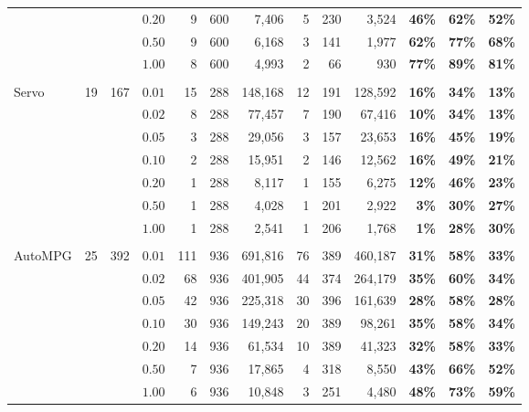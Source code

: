 \documentclass[mnsc,nonblindrev]{informs3} %
\begin{document}
\begin{center}
\begin{table}[h!]
\begin{tabular}{l r r r|r r r | r r r  | r r r }
		&&&$0.20$&9&600&7,406&5&230&3,524&\textbf{46\%}&\textbf{62\%}&\textbf{52\%}\\
		&&&$0.50$&9&600&6,168&3&141&1,977&\textbf{62\%}&\textbf{77\%}&\textbf{68\%}\\
		&&&$1.00$&8&600&4,993&2&66&930&\textbf{77\%}&\textbf{89\%}&\textbf{81\%}\\
		&&&&&&&&&&&&\\
		\multirow{7}{*}{Servo}&\multirow{7}{*}{19}&\multirow{7}{*}{167}&
		$0.01$&15&288&148,168&12&191&128,592&\textbf{16\%}&\textbf{34\%}&\textbf{13\%}\\
		&&&$0.02$&8&288&77,457&7&190&67,416&\textbf{10\%}&\textbf{34\%}&\textbf{13\%}\\
		&&&$0.05$&3&288&29,056&3&157&23,653&\textbf{16\%}&\textbf{45\%}&\textbf{19\%}\\
		&&&$0.10$&2&288&15,951&2&146&12,562&\textbf{16\%}&\textbf{49\%}&\textbf{21\%}\\
		&&&$0.20$&1&288&8,117&1&155&6,275&\textbf{12\%}&\textbf{46\%}&\textbf{23\%}\\
		&&&$0.50$&1&288&4,028&1&201&2,922&\textbf{3\%}&\textbf{30\%}&\textbf{27\%}\\
		&&&$1.00$&1&288&2,541&1&206&1,768&\textbf{1\%}&\textbf{28\%}&\textbf{30\%}\\
			&&&&&&&&&&&&\\
		\multirow{7}{*}{AutoMPG}&\multirow{7}{*}{25}&\multirow{7}{*}{392}&
		$0.01$&111&936&691,816&76&389&460,187&\textbf{31\%}&\textbf{58\%}&\textbf{33\%}\\
		&&&$0.02$&68&936&401,905&44&374&264,179&\textbf{35\%}&\textbf{60\%}&\textbf{34\%}\\
		&&&$0.05$&42&936&225,318&30&396&161,639&\textbf{28\%}&\textbf{58\%}&\textbf{28\%}\\
		&&&$0.10$&30&936&149,243&20&389&98,261&\textbf{35\%}&\textbf{58\%}&\textbf{34\%}\\
		&&&$0.20$&14&936&61,534&10&389&41,323&\textbf{32\%}&\textbf{58\%}&\textbf{33\%}\\
		&&&$0.50$&7&936&17,865&4&318&8,550&\textbf{43\%}&\textbf{66\%}&\textbf{52\%}\\
		&&&$1.00$&6&936&10,848&3&251&4,480&\textbf{48\%}&\textbf{73\%}&\textbf{59\%}\\
		\hline
	\end{tabular}
\end{table}
\end{center}
\end{document}
